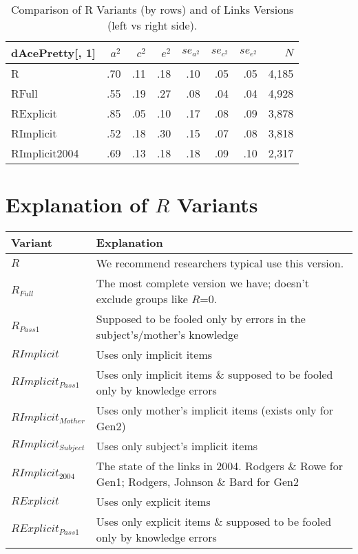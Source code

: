 \documentclass{article}\usepackage[]{graphicx}\usepackage[]{color}
\begin{document}
\begin{table}[ht]
\centering
{\large
\begin{tabular}{l|rrr|rrr|r}
  \hline
dAcePretty[, 1] & $a^2$ & $c^2$ & $e^2$ & $se_{a^2}$ & $se_{c^2}$ & $se_{e^2}$ & $N$ \\ 
  \hline
R & .70 & .11 & .18 & .10 & .05 & .05 & 4,185 \\ 
  RFull & .55 & .19 & .27 & .08 & .04 & .04 & 4,928 \\ 
  RExplicit & .85 & .05 & .10 & .17 & .08 & .09 & 3,878 \\ 
  RImplicit & .52 & .18 & .30 & .15 & .07 & .08 & 3,818 \\ 
  RImplicit2004 & .69 & .13 & .18 & .18 & .09 & .10 & 2,317 \\ 
   \hline
\end{tabular}
}
\caption{Comparison of R Variants (by rows) and of Links Versions (left vs right side).} 
\end{table}


\section{Explanation of $R$ Variants}
\begin{tabular}{l l}
\textbf{Variant} & \textbf{Explanation} \\
\hline
$R$ & We recommend researchers typical use this version. \\
$R_{Full}$ & The most complete version we have; doesn't exclude groups like $R$=0. \\
$R_{Pass1}$ & Supposed to be fooled only by errors in the subject's/mother's knowledge \\
\hline
$RImplicit$ & Uses only implicit items \\
$RImplicit_{Pass1}$ & Uses only implicit items \& supposed to be fooled only by knowledge errors \\
$RImplicit_{Mother}$ & Uses only mother's implicit items (exists only for Gen2)\\
$RImplicit_{Subject}$ & Uses only subject's implicit items\\
$RImplicit_{2004}$ & The state of the links in 2004.  Rodgers \& Rowe for Gen1; Rodgers, Johnson \& Bard for Gen2 \\
\hline
$RExplicit$ & Uses only explicit items \\
$RExplicit_{Pass1}$ & Uses only explicit items \& supposed to be fooled only by knowledge errors \\

\hline
\end{tabular}
\end{document}
